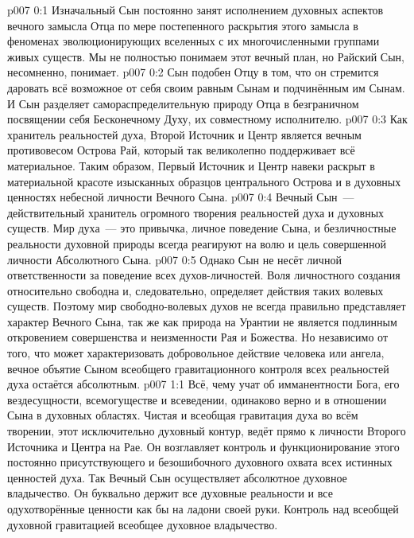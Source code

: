 \author{Божественный Советник}
\vs p007 0:1 Изначальный Сын постоянно занят исполнением духовных аспектов вечного замысла Отца по мере постепенного раскрытия этого замысла в феноменах эволюционирующих вселенных с их многочисленными группами живых существ. Мы не полностью понимаем этот вечный план, но Райский Сын, несомненно, понимает.
\vs p007 0:2 Сын подобен Отцу в том, что он стремится даровать всё возможное от себя своим равным Сынам и подчинённым им Сынам. И Сын разделяет самораспределительную природу Отца в безграничном посвящении себя Бесконечному Духу, их совместному исполнителю.
\vs p007 0:3 \pc Как хранитель реальностей духа, Второй Источник и Центр является вечным противовесом Острова Рай, который так великолепно поддерживает всё материальное. Таким образом, Первый Источник и Центр навеки раскрыт в материальной красоте изысканных образцов центрального Острова и в духовных ценностях небесной личности Вечного Сына.
\vs p007 0:4 \pc Вечный Сын~--- действительный хранитель огромного творения реальностей духа и духовных существ. Мир духа~--- это привычка, личное поведение Сына, и безличностные реальности духовной природы всегда реагируют на волю и цель совершенной личности Абсолютного Сына.
\vs p007 0:5 Однако Сын не несёт личной ответственности за поведение всех духов\hyp{}личностей. Воля личностного создания относительно свободна и, следовательно, определяет действия таких волевых существ. Поэтому мир свободно\hyp{}волевых духов не всегда правильно представляет характер Вечного Сына, так же как природа на Урантии не является подлинным откровением совершенства и неизменности Рая и Божества. Но независимо от того, что может характеризовать добровольное действие человека или ангела, вечное объятие Сыном всеобщего гравитационного контроля всех реальностей духа остаётся абсолютным.
\vs p007 1:1 Всё, чему учат об имманентности Бога, его вездесущности, всемогуществе и всеведении, одинаково верно и в отношении Сына в духовных областях. Чистая и всеобщая гравитация духа во всём творении, этот исключительно духовный контур, ведёт прямо к личности Второго Источника и Центра на Рае. Он возглавляет контроль и функционирование этого постоянно присутствующего и безошибочного духовного охвата всех истинных ценностей духа. Так Вечный Сын осуществляет абсолютное духовное владычество. Он буквально держит все духовные реальности и все одухотворённые ценности как бы на ладони своей руки. Контроль над всеобщей духовной гравитацией  всеобщее духовное владычество.
